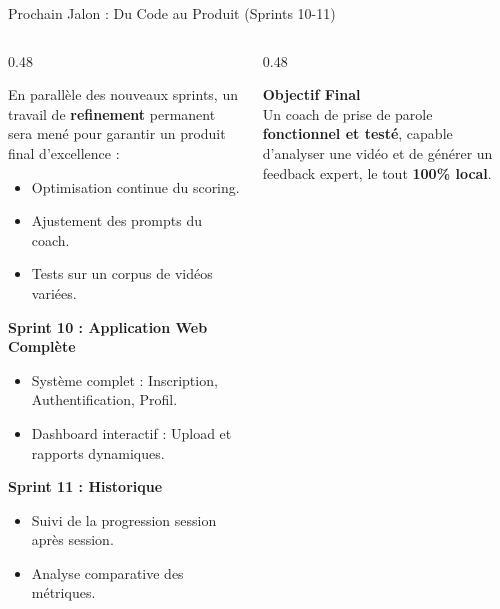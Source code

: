 \documentclass[10pt,aspectratio=169]{beamer}
\begin{document}
\begin{frame}{Prochain Jalon : Du Code au Produit (Sprints 10-11)}
    \begin{columns}[T]
        \begin{column}{0.48\textwidth}
            \begin{tcolorbox}[title=\textbf{Amélioration Continue}, colframe=accent, colback=accent!3]
                \scriptsize
                En parallèle des nouveaux sprints, un travail de \textbf{refinement} permanent sera mené pour garantir un produit final d'excellence :
                \begin{itemize}
                    \item Optimisation continue du scoring.
                    \item Ajustement des prompts du coach.
                    \item Tests sur un corpus de vidéos variées.
                \end{itemize}
            \end{tcolorbox}
            \vspace{0.2cm}
            \textbf{\textcolor{primary}{Sprint 10 : Application Web Complète}}
            \begin{itemize} \footnotesize
                \item Système complet : Inscription, Authentification, Profil.
                \item Dashboard interactif : Upload et rapports dynamiques.
            \end{itemize}
            \vspace{0.2cm}
            \textbf{\textcolor{primary}{Sprint 11 : Historique}}
            \begin{itemize} \footnotesize
                \item Suivi de la progression session après session.
                \item Analyse comparative des métriques.
            \end{itemize}
        \end{column}
        \begin{column}{0.48\textwidth}
            \begin{tcolorbox}[colback=primary!5, colframe=primary]
                \centering \small
                \textbf{Objectif Final}\\[0.3cm]
                \footnotesize
                Un coach de prise de parole \textbf{fonctionnel et testé}, capable d'analyser une vidéo et de générer un feedback expert, le tout \textbf{100\% local}.

\end{tcolorbox}
\end{column}
\end{columns}
\end{frame}
\end{document}
